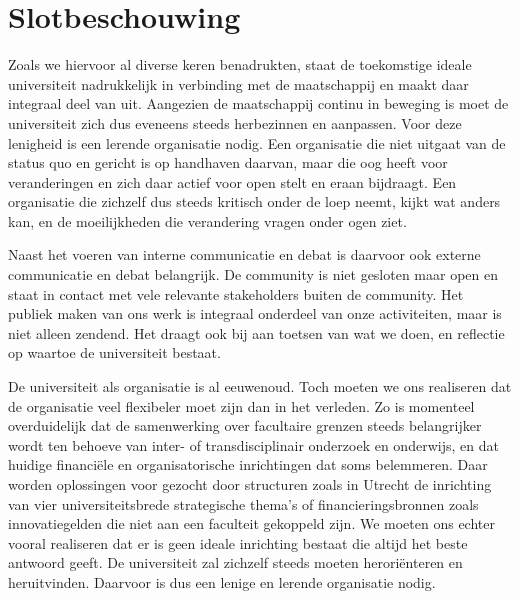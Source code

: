 \documentclass[smallauthor, chapterhaspagenum, nochapterinheader, pagenuminheader,  bigchapnum,medium2, tocpages,  garamond, titleinheader]{jote-book}
\begin{document}
	\section{Slotbeschouwing}



	Zoals we hiervoor al diverse keren benadrukten, staat de toekomstige ideale universiteit nadrukkelijk in verbinding met de maatschappij en maakt daar integraal deel van uit. Aangezien de maatschappij continu in beweging is moet de universiteit zich dus eveneens steeds herbezinnen en aanpassen. Voor deze lenigheid is een lerende organisatie nodig. Een organisatie die niet uitgaat van de status quo en gericht is op handhaven daarvan, maar die oog heeft voor veranderingen en zich daar actief voor open stelt en eraan bijdraagt. Een organisatie die zichzelf dus steeds kritisch onder de loep neemt, kijkt wat anders kan, en de moeilijkheden die verandering vragen onder ogen ziet.



	Naast het voeren van interne communicatie en debat is daarvoor ook externe communicatie en debat belangrijk. De community is niet gesloten maar open en staat in contact met vele relevante stakeholders buiten de community. Het publiek maken van ons werk is integraal onderdeel van onze activiteiten, maar is niet alleen zendend. Het draagt ook bij aan toetsen van wat we doen, en reflectie op waartoe de universiteit bestaat.



	De universiteit als organisatie is al eeuwenoud. Toch moeten we ons realiseren dat de organisatie veel flexibeler moet zijn dan in het verleden. Zo is momenteel overduidelijk dat de samenwerking over facultaire grenzen steeds belangrijker wordt ten behoeve van inter- of transdisciplinair onderzoek en onderwijs, en dat huidige financiële en organisatorische inrichtingen dat soms belemmeren. Daar worden oplossingen voor gezocht door structuren zoals in Utrecht de inrichting van vier universiteitsbrede strategische thema's of financieringsbronnen zoals innovatiegelden die niet aan een faculteit gekoppeld zijn. We moeten ons echter vooral realiseren dat er is geen ideale inrichting bestaat die altijd het beste antwoord geeft. De universiteit zal zichzelf steeds moeten heroriënteren en heruitvinden. Daarvoor is dus een lenige en lerende organisatie nodig.
\end{document}

